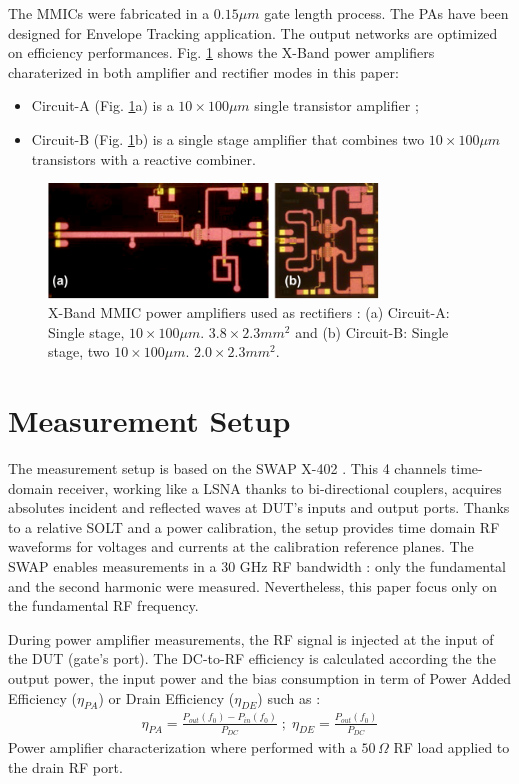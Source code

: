\documentclass[conference]{IEEEtran}
\begin{document}
The MMICs were fabricated in a $0.15\mu m$ gate length process. The PAs have been designed for Envelope Tracking application. The output networks are optimized on efficiency performances.
Fig. \ref{picture} shows the X-Band power amplifiers charaterized in both amplifier and rectifier modes in this paper:
\begin{itemize}
\item Circuit-A (Fig. \ref{picture}a) is a $10\times100\mu m$ single transistor amplifier ;
\item Circuit-B (Fig. \ref{picture}b) is a single stage amplifier that combines two $10\times100\mu m$ transistors with a reactive combiner.
\end{itemize}

\begin{figure}[ht!] %
\centering
\includegraphics[width=3.45in]{IMS2014_Pictures_PA.png}
\caption{ X-Band MMIC power amplifiers used as rectifiers : (a) Circuit-A: Single stage, $10\times100\mu m$. $3.8\times2.3mm^2$ and (b) Circuit-B: Single stage, two $10\times100\mu m$. $2.0\times2.3mm^2$.}
\label{picture}
\end{figure}



\section{Measurement Setup}
The measurement setup is based on the SWAP X-402 \cite{Verspecht2010,Roblin2011}. This 4 channels time-domain receiver, working like a LSNA \cite{Verspecht2005} thanks to bi-directional couplers, acquires absolutes incident and reflected waves at DUT's inputs and output ports. Thanks to a relative SOLT and a power calibration, the setup provides time domain RF waveforms for voltages and currents at the calibration reference planes. The SWAP enables measurements in a $30$ GHz RF bandwidth : only the fundamental and the second harmonic were measured. Nevertheless, this paper focus only on the fundamental RF frequency.

During power amplifier measurements, the RF signal is injected at the input of the DUT (gate's port). The DC-to-RF efficiency is calculated according the the output power, the input power and the bias consumption in term of Power Added Efficiency ($\eta_{PA}$) or Drain Efficiency ($\eta_{DE}$) such as :
\begin{eqnarray}
\eta_{PA}=\frac{P_{out}\left(f_0\right)-P_{in}\left(f_0\right)}{P_{DC}} \; ; \; \eta_{DE}=\frac{P_{out}\left(f_0\right)}{P_{DC}}
\end{eqnarray}
Power amplifier characterization where performed with a $50\,\Omega$ RF load applied to the drain RF port.
\end{document}
